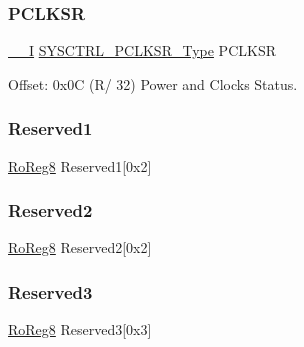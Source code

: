 \mbox{\label{struct_sysctrl_a4842dba7be30bf1892fe34b23a609181}} 
\subsubsection{\texorpdfstring{PCLKSR}{PCLKSR}}
{\footnotesize\ttfamily \mbox{\hyperlink{core__cm0plus_8h_af63697ed9952cc71e1225efe205f6cd3}{\+\_\+\+\_\+I}} \mbox{\hyperlink{union_s_y_s_c_t_r_l___p_c_l_k_s_r___type}{S\+Y\+S\+C\+T\+R\+L\+\_\+\+P\+C\+L\+K\+S\+R\+\_\+\+Type}} P\+C\+L\+K\+SR}



Offset\+: 0x0C (R/ 32) Power and Clocks Status. 

\mbox{\label{struct_sysctrl_a3e42d171d4eb8eda7a030a3453f2d9c0}} 
\subsubsection{\texorpdfstring{Reserved1}{Reserved1}}
{\footnotesize\ttfamily \mbox{\hyperlink{group___s_a_m_d21_e15_a__definitions_ga0d957f1433aaf5d70e4dc2b68288442d}{Ro\+Reg8}} Reserved1\mbox{[}0x2\mbox{]}}

\mbox{\label{struct_sysctrl_a39c013121a741bab8d9442a891da19a7}} 
\subsubsection{\texorpdfstring{Reserved2}{Reserved2}}
{\footnotesize\ttfamily \mbox{\hyperlink{group___s_a_m_d21_e15_a__definitions_ga0d957f1433aaf5d70e4dc2b68288442d}{Ro\+Reg8}} Reserved2\mbox{[}0x2\mbox{]}}

\mbox{\label{struct_sysctrl_ab22abf5c83fa4a01809facc55e0fda29}} 
\subsubsection{\texorpdfstring{Reserved3}{Reserved3}}
{\footnotesize\ttfamily \mbox{\hyperlink{group___s_a_m_d21_e15_a__definitions_ga0d957f1433aaf5d70e4dc2b68288442d}{Ro\+Reg8}} Reserved3\mbox{[}0x3\mbox{]}}

